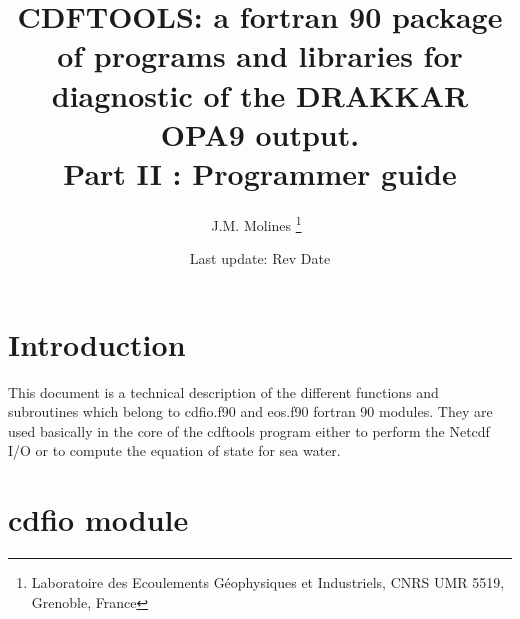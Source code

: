 \documentclass[a4paper,11pt]{article}
\begin{document}
\newcommand{\etal}{{\it et al.}}
\newcommand{\DegN}{$^{\circ}$N}
\newcommand{\DegW}{$^{\circ}$W}
\newcommand{\DegE}{$^{\circ}$E}
\newcommand{\DegS}{$^{\circ}$S}
\newcommand{\Deg}{$^{\circ}$}
\newcommand{\DegC}{$^{\circ}$C}
\newcommand{\DS}{ \renewcommand{\baselinestretch}{1.8} \tiny \normalsize}
\newcommand{\ST}{ \renewcommand{\baselinestretch}{1.2} \tiny \normalsize}
\newcommand{\ao}{add\_offset}
\newcommand{\SF}{scale\_factor}

\title{CDFTOOLS: a fortran 90 package of programs and libraries for diagnostic 
of the DRAKKAR OPA9 output.\\
Part II : Programmer guide}

\author{J.M. Molines  \thanks{Laboratoire des Ecoulements G\'eophysiques et Industriels, CNRS UMR 5519, Grenoble, France}\ }


\date{Last update: $ $Rev$ $  $ $Date$ $ }

\maketitle
\section*{Introduction}
This document is a technical description of the different functions and subroutines which belong to cdfio.f90 and eos.f90 fortran 90 modules.
They are used basically in the core of the cdftools program either to perform the Netcdf I/O or to compute the equation of state for sea water.

\section{ cdfio module}
\end{document}
